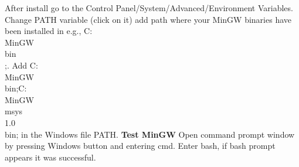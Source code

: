 After install go to the Control Panel/System/Advanced/Environment Variables.  Change PATH variable (click on it) add path where your MinGW binaries have been installed in e.g., C:\\MinGW\\bin\\;. Add C:\\MinGW\\bin;C:\\MinGW\\msys\\1.0\\bin; in the Windows file PATH. 
\textbf{Test MinGW}
Open command prompt window by pressing Windows button and entering cmd. Enter bash, if bash prompt appears it was successful.
